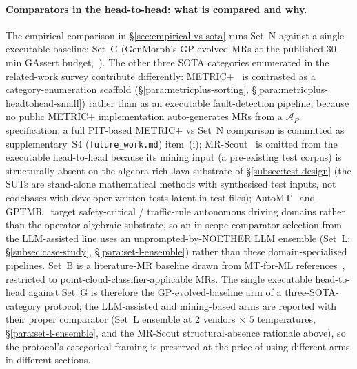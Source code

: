 \documentclass[manuscript]{acmart}
\begin{document}
\paragraph{Comparators in the head-to-head: what is compared and why.}
\label{para:comparators-and-why}
The empirical comparison in \S\ref{sec:empirical-vs-sota} runs Set~N
against a single executable baseline: Set~G (GenMorph's GP-evolved
MRs at the published 30-min GAssert budget,~\cite{GenMorph2024}). The
other three SOTA categories enumerated in the related-work survey
contribute differently: METRIC$+$~\cite{SunMETRICplus2021} is contrasted
as a category-enumeration scaffold (\S\ref{para:metricplus-sorting},
\S\ref{para:metricplus-headtohead-small}) rather than as an executable
fault-detection pipeline, because no public METRIC$+$ implementation
auto-generates MRs from a $\mathcal{A}_{P}$ specification: a full
PIT-based METRIC$+$ vs Set~N comparison is committed as supplementary~S4 (\texttt{future\_work.md})
item~(i); MR-Scout~\cite{MRScout2024} is omitted from the executable
head-to-head because its mining input (a pre-existing test corpus) is
structurally absent on the algebra-rich Java substrate of
\S\ref{subsec:test-design} (the SUTs are stand-alone mathematical
methods with synthesised test inputs, not codebases with developer-written
tests latent in test files); AutoMT~\cite{AutoMT2025} and
GPTMR~\cite{GPTMR2025} target safety-critical / traffic-rule autonomous
driving domains rather than the operator-algebraic substrate, so an
in-scope comparator selection from the LLM-assisted line uses an
unprompted-by-NOETHER LLM ensemble (Set~L; \S\ref{subsec:case-study},
\S\ref{para:set-l-ensemble}) rather than these domain-specialised
pipelines. Set~B is a literature-MR baseline drawn from MT-for-ML
references~\cite{Segura2016, Shin2024, AutoMT2025}, restricted to
point-cloud-classifier-applicable MRs. The single executable
head-to-head against Set~G is therefore the GP-evolved-baseline arm
of a three-SOTA-category protocol; the LLM-assisted and mining-based
arms are reported with their proper comparator (Set~L ensemble at
$2$ vendors $\times$ $5$ temperatures, \S\ref{para:set-l-ensemble}, and
the MR-Scout structural-absence rationale above), so the protocol's
categorical framing is preserved at the price of using different
arms in different sections.


\end{document}
